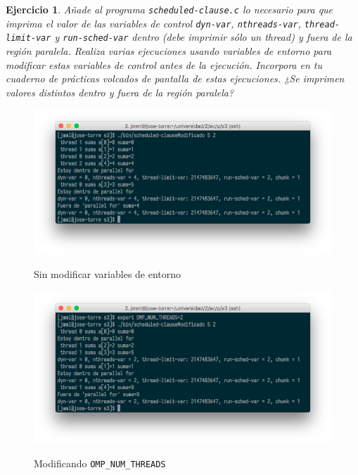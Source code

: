 \documentclass[11pt]{article}
\theoremstyle{definition-style}
\newtheorem{ejer}{Ejercicio}
\begin{document}
\begin{ejer}
    Añade al programa \texttt{scheduled-clause.c} lo necesario para que imprima el valor de las variables de control \texttt{dyn-var}, \texttt{nthreads-var}, \texttt{thread-limit-var} y \texttt{run-sched-var} dentro (debe imprimir sólo un thread) y fuera de la región paralela. Realiza varias ejecuciones usando variables de entorno para modificar estas variables de control antes de la ejecución. Incorpora en tu cuaderno de prácticas volcados de pantalla de estas ejecuciones. ¿Se imprimen valores distintos dentro y fuera de la región paralela?
\end{ejer}



\begin{figure}[H]
    \centering
    \caption{Sin modificar variables de entorno}
    \includegraphics[width=0.9\linewidth]{./img/31.png}
    \label{fig:}
\end{figure}

\begin{figure}[H]
    \centering
    \caption{Modificando \texttt{OMP\_NUM\_THREADS}}
    \includegraphics[width=0.9\linewidth]{./img/32.png}
    \label{fig:}
\end{figure}
\end{document}
